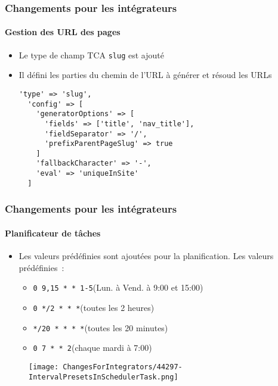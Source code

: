\begin{frame}[fragile]
	\frametitle{Changements pour les intégrateurs}
	\framesubtitle{Gestion des URL des pages}

	\lstset{basicstyle=\smaller\ttfamily}

	\begin{itemize}
		\item Le type de champ TCA \texttt{slug} est ajouté
		\item Il défini les parties du chemin de l'URL à générer et
			résoud les URLs

		\begin{lstlisting}
'type' => 'slug',
  'config' => [
    'generatorOptions' => [
      'fields' => ['title', 'nav_title'],
      'fieldSeparator' => '/',
      'prefixParentPageSlug' => true
    ]
    'fallbackCharacter' => '-',
    'eval' => 'uniqueInSite'
  ]
		\end{lstlisting}
	\end{itemize}

\end{frame}


\begin{frame}[fragile]
	\frametitle{Changements pour les intégrateurs}
	\framesubtitle{Planificateur de tâches}

	\begin{itemize}
		\item Les valeurs prédéfinies sont ajoutées pour la planification. Les valeurs prédéfinies~:

			\begin{itemize}
				\item \texttt{0 9,15 * * 1-5}\tabto{3.8cm}(Lun. à Vend. à 9:00 et 15:00)
				\item \texttt{0 */2 * * *}\tabto{3.8cm}(toutes les 2 heures)
				\item \texttt{*/20 * * * *}\tabto{3.8cm}(toutes les 20 minutes)
				\item \texttt{0 7 * * 2}\tabto{3.8cm}(chaque mardi à 7:00)
			\end{itemize}

	\end{itemize}

	\begin{figure}
		\texttt{[image: ChangesForIntegrators/44297-IntervalPresetsInSchedulerTask.png]}
	\end{figure}

\end{frame}

